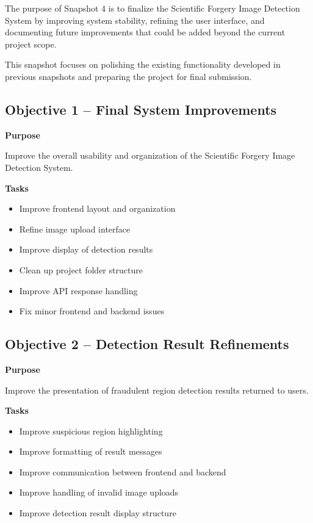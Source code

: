 \documentclass[12pt]{article}
\begin{document}
The purpose of Snapshot 4 is to finalize the Scientific Forgery Image Detection System
by improving system stability, refining the user interface, and documenting future
improvements that could be added beyond the current project scope.

This snapshot focuses on polishing the existing functionality developed in previous
snapshots and preparing the project for final submission.

\subsection{Objective 1 -- Final System Improvements}

\textbf{Purpose}

Improve the overall usability and organization of the Scientific Forgery Image Detection System.

\textbf{Tasks}

\begin{itemize}
    \item Improve frontend layout and organization
    \item Refine image upload interface
    \item Improve display of detection results
    \item Clean up project folder structure
    \item Improve API response handling
    \item Fix minor frontend and backend issues
\end{itemize}

\subsection{Objective 2 -- Detection Result Refinements}

\textbf{Purpose}

Improve the presentation of fraudulent region detection results returned to users.

\textbf{Tasks}

\begin{itemize}
    \item Improve suspicious region highlighting
    \item Improve formatting of result messages
    \item Improve communication between frontend and backend
    \item Improve handling of invalid image uploads
    \item Improve detection result display structure
\end{itemize}
\end{document}

